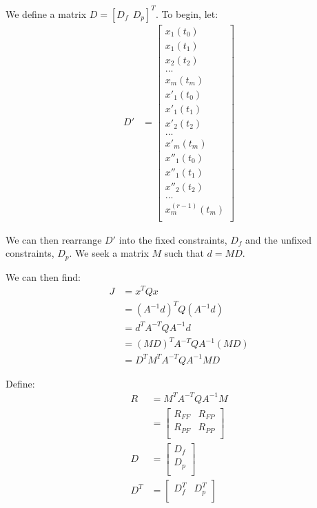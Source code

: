 \documentclass[11pt]{article}
\begin{document}
We define a matrix $D = [D_f \ \ D_p]^T$. To begin, let:
\begin{align*}
D' &= 
\begin{bmatrix}
  x_1 (t_0) \\
  x_1(t_1) \\
  x_2(t_2) \\  
  ... \\
  x_m(t_m) \\
   x'_1 (t_0) \\
  x'_1(t_1) \\
  x'_2(t_2) \\  
  ... \\
  x'_m(t_m) \\
  x''_1 (t_0) \\
    x''_1(t_1) \\
  x''_2(t_2) \\  
  ... \\
  x^{(r-1)}_m(t_m) \\
 \end{bmatrix}
\end{align*}

We can then rearrange $D'$ into the fixed constraints, $D_f$ and the unfixed constraints, $D_p$. We seek a matrix $M$ such that $d = MD$. 

We can then find:
\begin{align*}
J &= x^T Q x \\
&= (A^{-1} d)^T Q (A^{-1} d) \\
&= d^T A^{-T} Q A^{-1} d \\
&= (MD)^T A^{-T} Q A^{-1} (MD) \\
&= D^T M^T A^{-T} Q A^{-1}  M D
\end{align*}

Define:
\begin{align*}
R &= M^T A^{-T} Q A^{-1}  M \\
&= 
\begin{bmatrix}
R_{FF} & R_{FP} \\
R_{PF} & R_{PP} \\
\end{bmatrix} \\
D &= 
\begin{bmatrix}
D_f \\
D_p \\
\end{bmatrix} \\
D^T &= 
\begin{bmatrix} 
D_f^T & D_p^T \\
\end{bmatrix}
\end{align*}
\end{document}
